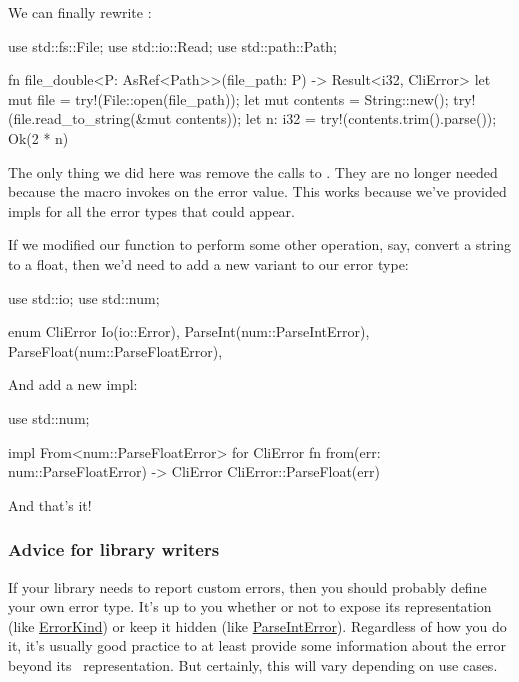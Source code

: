 \blank

We can finally rewrite :

\begin{rustc}
use std::fs::File;
use std::io::Read;
use std::path::Path;

fn file_double<P: AsRef<Path>>(file_path: P) -> Result<i32, CliError> {
    let mut file = try!(File::open(file_path));
    let mut contents = String::new();
    try!(file.read_to_string(&mut contents));
    let n: i32 = try!(contents.trim().parse());
    Ok(2 * n)
}
\end{rustc}

The only thing we did here was remove the calls to . They are no longer needed because the  
macro invokes  on the error value. This works because we've provided  impls for all the error 
types that could appear.

\blank

If we modified our  function to perform some other operation, say, convert a string to a float, then 
we'd need to add a new variant to our error type:

\begin{rustc}
use std::io;
use std::num;

enum CliError {
    Io(io::Error),
    ParseInt(num::ParseIntError),
    ParseFloat(num::ParseFloatError),
}
\end{rustc}

And add a new  impl:

\begin{rustc}
use std::num;

impl From<num::ParseFloatError> for CliError {
    fn from(err: num::ParseFloatError) -> CliError {
        CliError::ParseFloat(err)
    }
}
\end{rustc}

And that's it!

\subsubsection*{Advice for library writers}

If your library needs to report custom errors, then you should probably define your own error type. It's up to you whether 
or not to expose its representation (like \href{https://doc.rust-lang.org/std/io/enum.ErrorKind.html}{ErrorKind}) or keep it 
hidden (like \href{https://doc.rust-lang.org/std/num/struct.ParseIntError.html}{ParseIntError}). Regardless of how you do it, 
it's usually good practice to at least provide some information about the error beyond its \String\ representation. But 
certainly, this will vary depending on use cases.

